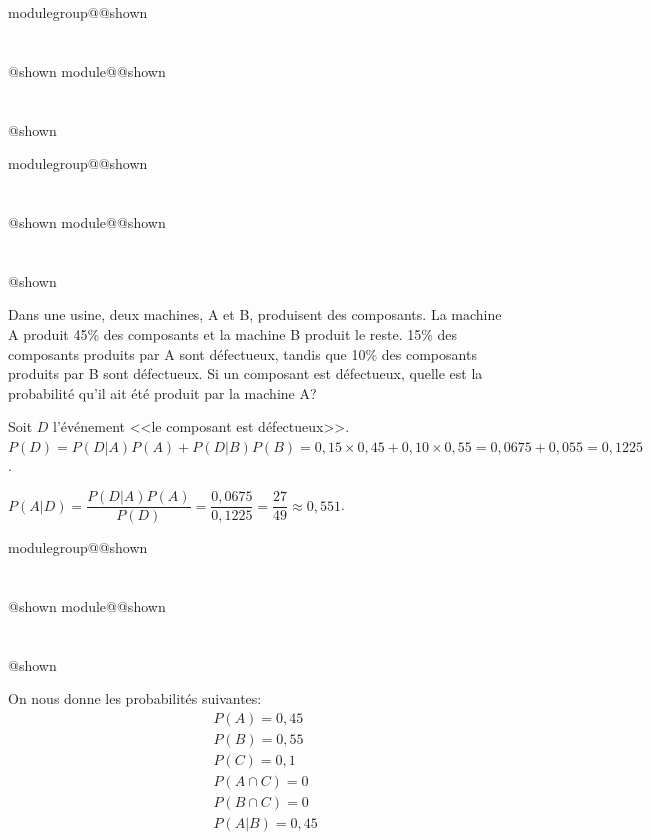 \documentclass{Evaluation}
\makeatletter
\newcommand{\currentmodulekey}{}
\newcommand{\currentmoduletitle}{}
\newcommand{\currentgroupkey}{}
\newcommand{\currentgrouptitle}{}
\newcommand{\showmoduleifneeded}{%
  \ifx\currentgroupkey\empty\else
    \expandafter\ifx\csname modulegroup@\currentgroupkey @shown\endcsname\relax
      \section*{\currentgrouptitle}%
      \expandafter\gdef\csname modulegroup@\currentgroupkey @shown\endcsname{1}%
    \fi
  \fi
  \expandafter\ifx\csname module@\currentmodulekey @shown\endcsname\relax
    \section*{\currentmoduletitle}%
    \expandafter\gdef\csname module@\currentmodulekey @shown\endcsname{1}%
  \fi
}
\newenvironment{H24}{\showmoduleifneeded}{}
\newenvironment{A24}{\showmoduleifneeded}{}
\makeatother
\begin{document}
\begin{questions}
\begin{H24}
\end{H24}

\begin{H24}
\question {} %
Dans une usine, deux machines, A et B, produisent des composants. La machine A produit 45\% des composants et la machine B produit le reste. 15\% des composants produits par A sont défectueux, tandis que 10\% des composants produits par B sont défectueux. Si un composant est défectueux, quelle est la probabilité qu'il ait été produit par la machine A?

\begin{solution}
    Soit $D$ l'événement <<le composant est défectueux>>. $P(D)=P(D|A)P(A)+P(D|B)P(B)=0,15\times 0,45+0,10\times 0,55=0,0675+0,055=0,1225$.

    $P(A|D)=\dfrac{P(D|A)P(A)}{P(D)}=\dfrac{0,0675}{0,1225}=\dfrac{27}{49}\approx 0,551$.
\end{solution}
\end{H24}

\begin{A24}
\question {} %
On nous donne les probabilités suivantes:
\[
\begin{aligned}
    & P(A) = 0,45 \\
    & P(B) = 0,55 \\
    & P(C) = 0,1 \\
    & P(A\cap C) = 0 \\
    & P(B\cap C) = 0 \\
    & P(A | B) = 0,45 \\
    &
\end{aligned}
\]

\begin{parts}

\end{parts}
\end{A24}
\end{questions}
\end{document}
